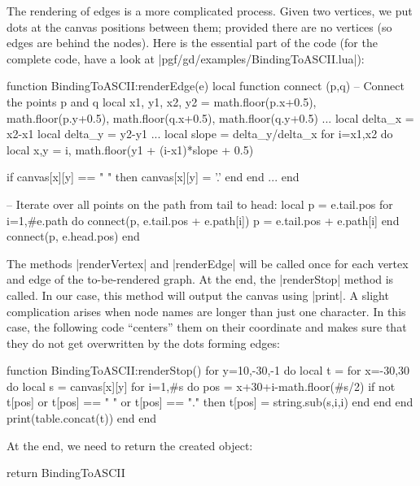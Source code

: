 The rendering of edges is a more complicated process. Given two
vertices, we put dots at the canvas positions between them; provided
there are no vertices (so edges are behind the nodes). Here is the
essential part of the code (for the complete code, have a look at
|pgf/gd/examples/BindingToASCII.lua|):


\begin{codeexample}
function BindingToASCII:renderEdge(e)
  local function connect (p,q)
    -- Connect the points p and q
    local x1, y1, x2, y2 = math.floor(p.x+0.5), math.floor(p.y+0.5), math.floor(q.x+0.5), math.floor(q.y+0.5)
    ...
    local delta_x = x2-x1
    local delta_y = y2-y1
    ...
      local slope = delta_y/delta_x
      for i=x1,x2 do
        local x,y = i, math.floor(y1 + (i-x1)*slope + 0.5)
    
        if canvas[x][y] == " " then
          canvas[x][y] = '.'
        end
      end
    ...
  end
  
  -- Iterate over all points on the path from tail to head:
  local p = e.tail.pos
  for i=1,#e.path do
    connect(p, e.tail.pos + e.path[i])
    p = e.tail.pos + e.path[i]
  end  
  connect(p, e.head.pos)
end
\end{codeexample}


The methods |renderVertex| and |renderEdge| will be called once for
each vertex and edge of the to-be-rendered graph. At the end, the
|renderStop| method is called. In our case, this method will output
the canvas using |print|. A slight complication arises when node names
are longer than just one character. In this case, the following code
``centers'' them on their coordinate and makes sure that they do not
get overwritten by the dots forming edges:

\begin{codeexample}
function BindingToASCII:renderStop()
  for y=10,-30,-1 do
    local t = {}
    for x=-30,30 do
      local s = canvas[x][y]
      for i=1,#s do
        pos = x+30+i-math.floor(#s/2)
        if not t[pos] or t[pos] == " " or t[pos] == "." then
          t[pos] = string.sub(s,i,i)
        end
      end
    end
    print(table.concat(t))
  end
end
\end{codeexample}

At the end, we need to return the created object:

\begin{codeexample}
return BindingToASCII
\end{codeexample}


